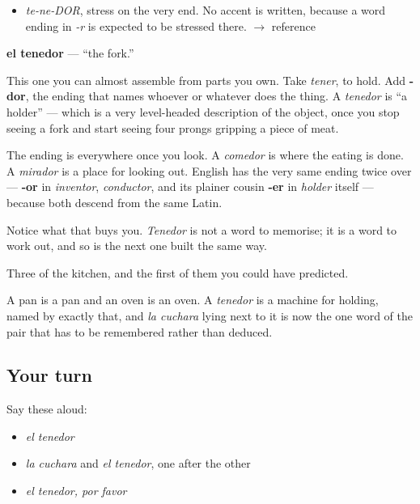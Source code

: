 \begin{sounds}
\begin{itemize}
\raggedright
  \item \emph{te-ne-DOR}, stress on the very end. No accent is written, because a word ending in \emph{-r} is expected to be stressed there. $\to$ reference
\end{itemize}
\end{sounds}

\begin{cousinweb}
\textbf{el tenedor} — \textquotedblleft{}the fork.\textquotedblright{}

This one you can almost assemble from parts you own. Take \emph{tener}, to hold. Add \textbf{-dor}, the ending that names whoever or whatever does the thing. A \emph{tenedor} is \textquotedblleft{}a holder\textquotedblright{} — which is a very level-headed description of the object, once you stop seeing a fork and start seeing four prongs gripping a piece of meat.

The ending is everywhere once you look. A \emph{comedor} is where the eating is done. A \emph{mirador} is a place for looking out. English has the very same ending twice over — \textbf{-or} in \emph{inventor}, \emph{conductor}, and its plainer cousin \textbf{-er} in \emph{holder} itself — because both descend from the same Latin.

Notice what that buys you. \emph{Tenedor} is not a word to memorise; it is a word to work out, and so is the next one built the same way.
\end{cousinweb}

\begin{grammarlens}[title={What you've built}]
Three of the kitchen, and the first of them you could have predicted.

A pan is a pan and an oven is an oven. A \emph{tenedor} is a machine for holding, named by exactly that, and \emph{la cuchara} lying next to it is now the one word of the pair that has to be remembered rather than deduced.
\end{grammarlens}

\subsection*{Your turn}
Say these aloud:

\begin{itemize}
\raggedright
  \item \emph{el tenedor}
  \item \emph{la cuchara} and \emph{el tenedor}, one after the other
  \item \emph{el tenedor, por favor}
\end{itemize}

